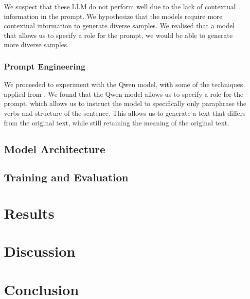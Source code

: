 \documentclass{article}
\begin{document}
We suspect that these LLM do not perform well due to the lack of contextual
information in the prompt. We hypothesize that the models require more
contextual information to generate diverse samples. We realised that a model
that allows us to specify a role for the prompt, we would be able to generate
more diverse samples.

\subsubsection{Prompt Engineering}

We proceeded to experiment with the Qwen model, with some of the techniques applied
from \cite{promptingguide}. We found that the Qwen model allows us to specify
a role for the prompt, which allows us to instruct the model to specifically only
paraphrase the verbs and structure of the sentence. This allows us to generate
a text that differs from the original text, while still retaining the meaning
of the original text.


\subsection{Model Architecture}

\subsection{Training and Evaluation}

\section{Results}

\section{Discussion}

\section{Conclusion}



\end{document}
